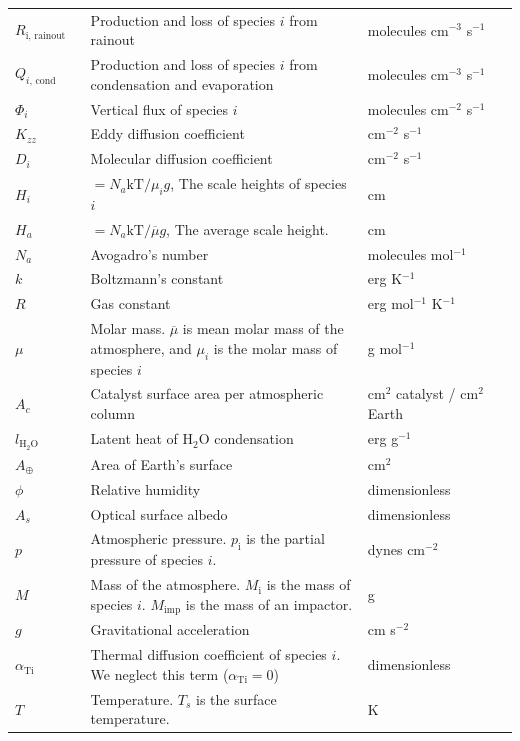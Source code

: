 \begin{spacing}{1.0}
\begin{center}
\begin{tabularx}{\linewidth}{p{0.15\linewidth} | p{0.55\linewidth} | p{0.3\linewidth}}
  $R_{\text{i, rainout}}$ & Production and loss of species $i$ from rainout & molecules cm$^{-3}$ s$^{-1}$
  \\
  $Q_{i\text{, cond}}$ & Production and loss of species $i$ from condensation and evaporation & molecules cm$^{-3}$ s$^{-1}$
  \\
  $\Phi_{i}$ & Vertical flux of species $i$ & molecules cm$^{-2}$ s$^{-1}$ 
  \\
  $K_{zz}$ & Eddy diffusion coefficient & cm$^{-2}$ s$^{-1}$ 
  \\
  $D_{i}$ & Molecular diffusion coefficient & cm$^{-2}$ s$^{-1}$ 
  \\
  $H_{i}$ & $= N_{a}\text{kT}\text{/}\mu_{i}g$, The scale heights of species $i$ & cm 
  \\
  $H_{a}$ & $= N_{a}\text{kT}\text{/}\overline{\mu}g$, The average scale height. & cm 
  \\
  $N_{a}$ & Avogadro's number & molecules mol$^{-1}$ 
  \\
  $k$ & Boltzmann's constant & erg K$^{-1}$ 
  \\
  $R$ & Gas constant & erg mol$^{-1}$ K$^{-1}$ 
  \\
  $\mu$ & Molar mass. $\overline{\mu}$ is mean molar mass of the atmosphere, and $\mu_{i}$ is the molar mass of species $i$ & g mol$^{-1}$ 
  \\
  $A_c$ & Catalyst surface area per atmospheric column & cm$^2$ catalyst / cm$^2$ Earth
  \\
  $l_\mathrm{H_2O}$ & Latent heat of H$_2$O condensation & erg g$^{-1}$ 
  \\
  $A_\oplus$ & Area of Earth's surface & cm$^2$
  \\
  $\phi$ & Relative humidity & dimensionless
  \\
  $A_s$ & Optical surface albedo & dimensionless
  \\
  $p$ & Atmospheric pressure. $p_\mathrm{i}$ is the partial pressure of species $i$. & dynes cm$^{-2}$ 
  \\
  $M$ & Mass of the atmosphere. $M_\mathrm{i}$ is the mass of species $i$. $M_\mathrm{imp}$ is the mass of an impactor. & g
  \\
  $g$ & Gravitational acceleration & cm s$^{-2}$ 
  \\
  $\alpha_{\text{Ti}}$ & Thermal diffusion coefficient of species $i$. We neglect this term ($\alpha_{\text{Ti}} = 0$) & dimensionless
  \\
  $T$ & Temperature. $T_s$ is the surface temperature. & K 
  \\
  \hline
  \end{tabularx}
\end{center}
\end{spacing}

